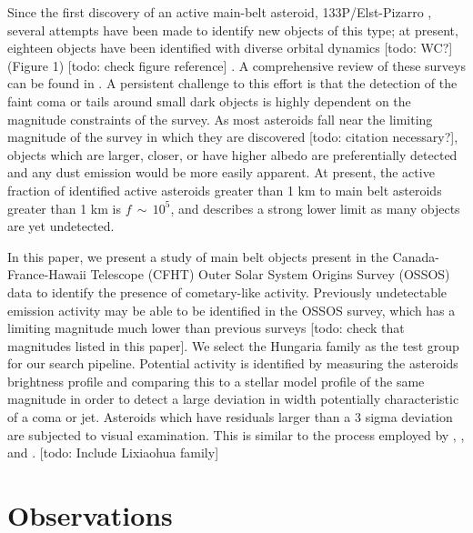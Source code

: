 \documentclass[iop,apj]{emulateapj}
\begin{document}
Since the first discovery of an active main-belt asteroid, 133P/Elst-Pizarro \citep{elst96}, several attempts have been made to identify new objects of this type; at present, eighteen objects have been identified with diverse orbital dynamics [todo: WC?] (Figure 1) [todo: check figure reference] \citep{jewitt15}. A comprehensive review of these surveys can be found in \citet{hsieh15}.  A persistent challenge to this effort is that the detection of the faint coma or tails around small dark objects is highly dependent on the magnitude constraints of the survey. As most asteroids fall near the limiting magnitude of the survey in which they are discovered [todo: citation necessary?], objects which are larger, closer, or have higher albedo are preferentially detected and any dust emission would be more easily apparent. At present, the active fraction of identified active asteroids greater than 1 km to main belt asteroids greater than 1 km is $f \, \sim \, 10^5$, and describes a strong lower limit as many objects are yet undetected. \citep{jewitt15} %

In this paper, we present a study of main belt objects present in the Canada-France-Hawaii Telescope (CFHT) Outer Solar System Origins Survey (OSSOS) data to identify the presence of cometary-like activity. Previously undetectable emission activity may be able to be identified in the OSSOS survey, which has a limiting magnitude much lower than previous surveys \citep{hsieh15} [todo: check that magnitudes listed in this paper]. We select the Hungaria family as the test group for our search pipeline. Potential activity is identified by measuring the asteroids brightness profile and comparing this to a stellar model profile of the same magnitude in order to detect a large deviation in width potentially characteristic of a coma or jet. Asteroids which have residuals larger than a 3 sigma deviation are subjected to visual examination. This is similar to the process employed by \cite{luu92}, \cite{sonnett11}, and \cite{gilbert09}.
[todo: Include Lixiaohua family]



\section{Observations}
\end{document}
